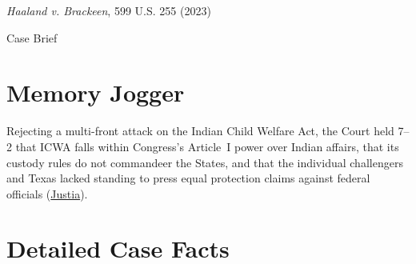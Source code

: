 \documentclass[12pt]{article}
\begin{document}
\begin{center}
{\LARGE \textit{Haaland v. Brackeen}, 599 U.S. 255 (2023)\par}
\vspace{0.8em}
{\large Case Brief\par}
\end{center}
\vspace{1em}

\section{Memory Jogger}
Rejecting a multi-front attack on the Indian Child Welfare Act, the Court held 7--2 that ICWA falls within Congress's Article~I power over Indian affairs, that its custody rules do not commandeer the States, and that the individual challengers and Texas lacked standing to press equal protection claims against federal officials (\href{https://supreme.justia.com/cases/federal/us/599/21-376/}{Justia}).

\section{Detailed Case Facts}
\end{document}
